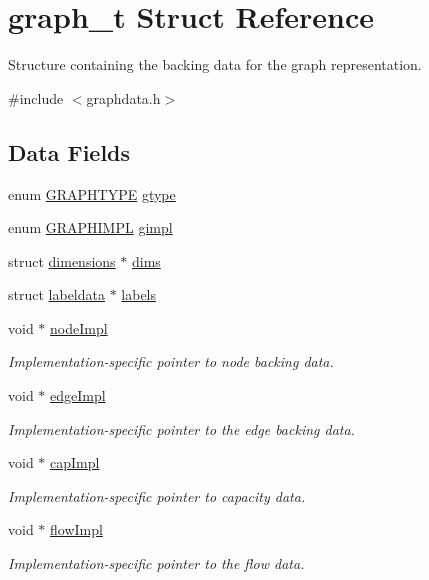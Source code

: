 \hypertarget{structgraph__t}{}\section{graph\+\_\+t Struct Reference}
\label{structgraph__t}


Structure containing the backing data for the graph representation.  




{\ttfamily \#include $<$graphdata.\+h$>$}

\subsection*{Data Fields}
\begin{DoxyCompactItemize}
\item 
enum \hyperlink{graphdata_8h_a384e88b524b782ff50439055cbc8a5c2}{G\+R\+A\+P\+H\+T\+Y\+PE} \hyperlink{structgraph__t_a602be255ab0523e0a5fe28436a29159a}{gtype}
\item 
enum \hyperlink{graphdata_8h_ad7f3a639f97221897a0429715dccefe6}{G\+R\+A\+P\+H\+I\+M\+PL} \hyperlink{structgraph__t_a220aff118ba6d13c927486099988c03d}{gimpl}
\item 
struct \hyperlink{graphdata_8h_a08b79828d8e700b1ff86fc235a83089f}{dimensions} $\ast$ \hyperlink{structgraph__t_ab0b7dd9b19e20a1564ba1f02ad41511e}{dims}
\item 
struct \hyperlink{graphdata_8h_a625fc818ed28f282dba71f20cd31b848}{labeldata} $\ast$ \hyperlink{structgraph__t_a2ea51094b5b0a3b3035895948ded5b44}{labels}
\item 
void $\ast$ \hyperlink{structgraph__t_a3bf6344f03f4cbc69345d026da2e3368}{node\+Impl}
\begin{DoxyCompactList}\small\item\em Implementation-\/specific pointer to node backing data. \end{DoxyCompactList}\item 
void $\ast$ \hyperlink{structgraph__t_acadea26a56e788cb109413045138faba}{edge\+Impl}
\begin{DoxyCompactList}\small\item\em Implementation-\/specific pointer to the edge backing data. \end{DoxyCompactList}\item 
void $\ast$ \hyperlink{structgraph__t_ab85359c7dfbc46f84976a85c4104b1f5}{cap\+Impl}
\begin{DoxyCompactList}\small\item\em Implementation-\/specific pointer to capacity data. \end{DoxyCompactList}\item 
void $\ast$ \hyperlink{structgraph__t_aff85993441e72a7815da3fa1b048e5eb}{flow\+Impl}
\begin{DoxyCompactList}\small\item\em Implementation-\/specific pointer to the flow data. \end{DoxyCompactList}\end{DoxyCompactItemize}


